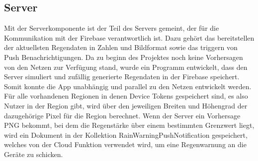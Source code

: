 \subsection{Server}\label{server}
Mit der Serverkomponente ist der Teil des Servers gemeint, der für die Kommunikation mit der Firebase verantwortlich ist. Dazu gehört das bereitstellen der aktuellsten Regendaten in Zahlen und Bildformat sowie das triggern von Push Benachrichtigungen. 
Da zu beginn des Projektes noch keine Vorhersagen von den Netzen zur Verfügung stand, wurde ein Programm entwickelt, dass den Server simuliert und zufällig generierte Regendaten in der Firebase speichert. Somit konnte die App unabhängig und parallel zu den Netzen entwickelt werden. 
Für alle vorhandenen Regionen in denen Device Tokens gespeichert sind, es also Nutzer in der Region gibt, wird über den jeweiligen Breiten und Höhengrad der dazugehörige Pixel für die Region berechnet.
Wenn der Server ein Vorhersage PNG bekommt, bei dem die Regenstärke über einem bestimmten Grenzwert liegt, wird ein Dokument in der Kollektion RainWarningPushNotification gespeichert, welches von der Cloud Funktion verwendet wird, um eine Regenwarnung an die Geräte zu schicken. 